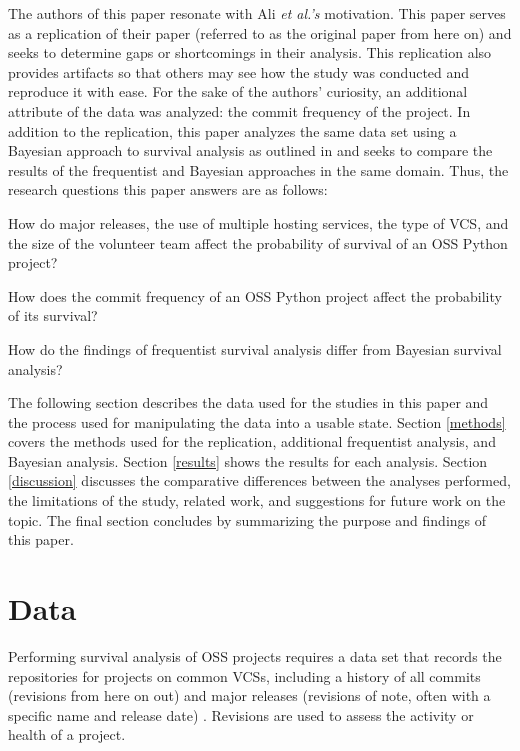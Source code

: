 \documentclass[acmconf]{acmart}
\begin{document}
The authors of this paper resonate with Ali \emph{et al.'s} motivation. 
This paper serves as a replication of their paper \cite{ali2020cheating} (referred to as the original paper from here on)  and seeks to determine gaps or shortcomings in their analysis.
This replication also provides artifacts so that others may see how the study was conducted and reproduce it with ease.
For the sake of the authors' curiosity, an additional attribute of the data was analyzed: the commit frequency of the project.
In addition to the replication, this paper analyzes the same data set using a Bayesian approach to survival analysis as outlined in \cite{kelter2020bayesian} and seeks to compare the results of the frequentist and Bayesian approaches in the same domain.
Thus, the research questions this paper answers are as follows:

\begin{questions}
    \item How do major releases, the use of multiple hosting services, the type of VCS, and the size of the volunteer team affect the probability of survival of an OSS Python project?
    \item How does the commit frequency of an OSS Python project affect the probability of its survival?
    \item How do the findings of frequentist survival analysis differ from Bayesian survival analysis?
\end{questions}

The following section describes the data used for the studies in this paper and the process used for manipulating the data into a usable state.
Section \ref{methods} covers the methods used for the replication, additional frequentist analysis, and Bayesian analysis.
Section \ref{results} shows the results for each analysis.
Section \ref{discussion} discusses the comparative differences between the analyses performed, the limitations of the study, related work, and suggestions for future work on the topic.
The final section concludes by summarizing the purpose and findings of this paper. 

\section{Data} \label{data}

Performing survival analysis of OSS projects requires a data set that records the repositories for projects on common VCSs, including a history of all commits (revisions from here on out) and major releases (revisions of note, often with a specific name and release date) \cite{ali2020cheating}.
Revisions are used to assess the activity or health of a project.
\end{document}
